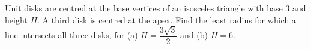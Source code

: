 Unit disks are centred at the base vertices of an isosceles triangle with base 3 and height $H$. A third disk is centred at the apex. Find the least radius for which a line intersects all three disks, for (a) $H=\dfrac{3\sqrt3}{2}$ and (b) $H=6$.
